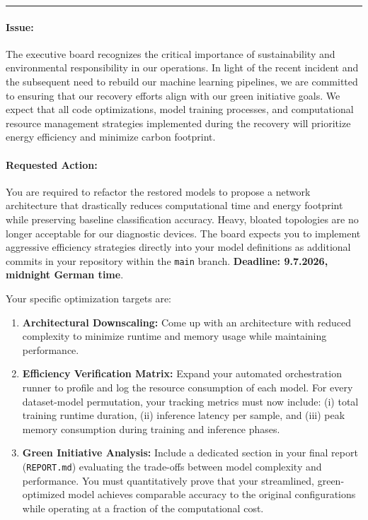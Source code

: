 \documentclass[11pt,a4paper]{article}
\begin{document}
\vspace{0.4cm}
\hrule

\paragraph{Issue:}
The executive board recognizes the critical importance of sustainability and environmental responsibility in our operations. In light of the recent incident and the subsequent need to rebuild our machine learning pipelines, we are committed to ensuring that our recovery efforts align with our green initiative goals. We expect that all code optimizations, model training processes, and computational resource management strategies implemented during the recovery will prioritize energy efficiency and minimize carbon footprint.

\vspace{-0.4cm}
\paragraph{Requested Action:}
You are required to refactor the restored models to propose a network architecture that drastically reduces computational time and energy footprint while preserving baseline classification accuracy. Heavy, bloated topologies are no longer acceptable for our diagnostic devices. 
The board expects you to implement aggressive efficiency strategies directly into your model definitions as additional commits in your repository within the \texttt{main} branch. \textbf{Deadline: 9.7.2026, midnight German time}. 

Your specific optimization targets are:
\begin{enumerate}
    \item \textbf{Architectural Downscaling:} Come up with an architecture with reduced complexity to minimize runtime and memory usage while maintaining performance.
    \item \textbf{Efficiency Verification Matrix:} Expand your automated orchestration runner to profile and log the resource consumption of each model. For every dataset-model permutation, your tracking metrics must now include: (i) total training runtime duration, (ii) inference latency per sample, and (iii) peak memory consumption during training and inference phases.
    \item \textbf{Green Initiative Analysis:} Include a dedicated section in your final report (\texttt{REPORT.md}) evaluating the trade-offs between model complexity and performance. You must quantitatively prove that your streamlined, green-optimized model achieves comparable accuracy to the original configurations while operating at a fraction of the computational cost.
\end{enumerate}
\end{document}
